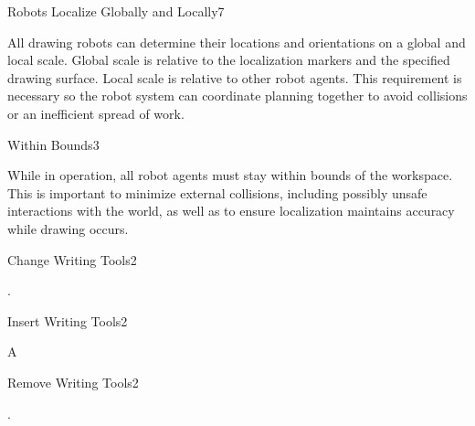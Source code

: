\begin{functional_requirement}{Robots Localize Globally and Locally}{7}
\label{fr:localize}
\item All drawing robots can determine their locations and orientations on a global and local scale. Global scale is relative to the localization markers and the specified drawing surface. Local scale is relative to other robot agents. This requirement is necessary so the robot system can coordinate planning together to avoid collisions or an inefficient spread of work. 
\end{functional_requirement}

\begin{functional_requirement}{Within Bounds}{3}
\label{fr:in_bounds}
\item While in operation, all robot agents must stay within bounds of the workspace. This is important to minimize external collisions, including possibly unsafe interactions with the world, as well as to ensure localization maintains accuracy while drawing occurs.
\end{functional_requirement}

\begin{functional_requirement}{Change Writing Tools}{2}
\item .
\end{functional_requirement}

\begin{functional_requirement}{Insert Writing Tools}{2}
\label{fr:insert_tool}
\item A
\end{functional_requirement}

\begin{functional_requirement}{Remove Writing Tools}{2}
\label{fr:remove_tool}
\item .
\end{functional_requirement}


